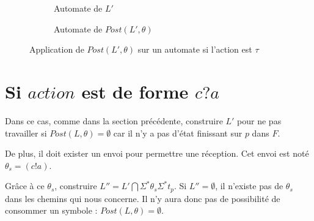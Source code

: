 \begin{figure}[H]
    \centering
    \begin{subfigure}{0.5\linewidth}
        \centering
        \caption{Automate de $L'$}
    \end{subfigure}\hfill
    \begin{subfigure}{0.5\linewidth}
        \centering
        \caption{Automate de $Post(L',\theta)$}
    \end{subfigure}
    \caption{Application de $Post(L',\theta)$ sur un automate si l'action est $\tau$}
\end{figure}


\section{Si $action$ est de forme $c?a$}

Dans ce cas, comme dans la section précédente, construire $L'$ pour ne pas travailler si $Post(L,\theta)=\emptyset$ car il n'y a pas d'état finissant sur $p$ dans $F$.

De plus, il doit exister un envoi pour permettre une réception. Cet envoi est noté $\theta_s=(c!a)$.

Grâce à ce $\theta_s$, construire $L''=L'\bigcap\Sigma^*\theta_s\Sigma^*t_p$. Si $L''=\emptyset$, il n'existe pas de $\theta_s$ dans les chemins qui nous concerne. Il n'y aura donc pas de possibilité de consommer un symbole : $Post(L,\theta)=\emptyset$.


